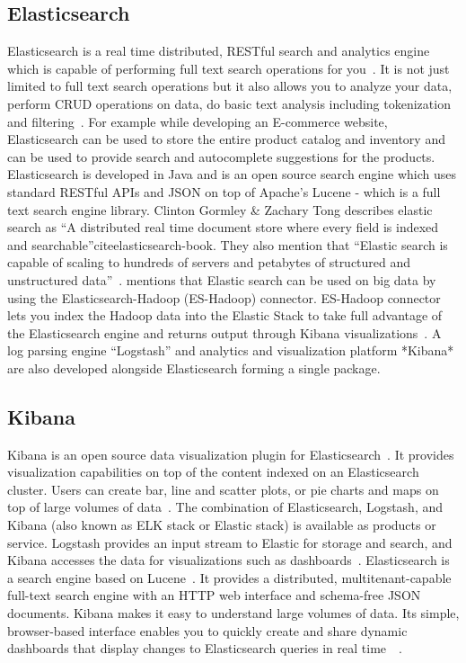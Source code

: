    \pv
	
\subsection{Elasticsearch}

Elasticsearch is a real time distributed, RESTful search and analytics
engine which is capable of performing full text search operations for
you~\cite{www-elasticsearch}.  It is not just limited to full text
search operations but it also allows you to analyze your data, perform
CRUD operations on data, do basic text analysis including tokenization
and filtering~\cite{www-elasticsearch-intro}. For example while
developing an E-commerce website, Elasticsearch can be used to store
the entire product catalog and inventory and can be used to provide
search and autocomplete suggestions for the products. Elasticsearch is
developed in Java and is an open source search engine which uses
standard RESTful APIs and JSON on top of Apache's Lucene - which is a
full text search engine library. Clinton Gormley \& Zachary Tong
describes elastic search as ``A distributed real time document store
where every field is indexed and
searchable''cite{elasticsearch-book}. They also mention that ``Elastic
search is capable of scaling to hundreds of servers and petabytes of
structured and unstructured
data''~\cite{www-elasticsearch-hadoop}. mentions that Elastic search
can be used on big data by using the Elasticsearch-Hadoop (ES-Hadoop)
connector. ES-Hadoop connector lets you index the Hadoop data into the
Elastic Stack to take full advantage of the Elasticsearch engine and
returns output through Kibana
visualizations~\cite{www-wikipedia-elasticsearch}. A log parsing
engine ``Logstash'' and analytics and visualization platform *Kibana*
are also developed alongside Elasticsearch forming a single package.

    \pv
    
\subsection{Kibana}

Kibana is an open source data visualization plugin for
Elasticsearch~\cite{www-kibana-1}. It provides visualization
capabilities on top of the content indexed on an Elasticsearch
cluster. Users can create bar, line and scatter plots, or pie charts
and maps on top of large volumes of data~\cite{www-kibana-2}. The
combination of Elasticsearch, Logstash, and Kibana (also known as ELK
stack or Elastic stack) is available as products or service. Logstash
provides an input stream to Elastic for storage and search, and Kibana
accesses the data for visualizations such as
dashboards~\cite{www-kibana-3}.  Elasticsearch is a search engine
based on Lucene~\cite{www-kibana-4}. It provides a distributed,
multitenant-capable full-text search engine with an HTTP web interface
and schema-free JSON documents. Kibana makes it easy to understand
large volumes of data. Its simple, browser-based interface enables you
to quickly create and share dynamic dashboards that display changes to
Elasticsearch queries in real
time~\cite{www-kibana-5}~\cite{www-kibana-6}.

